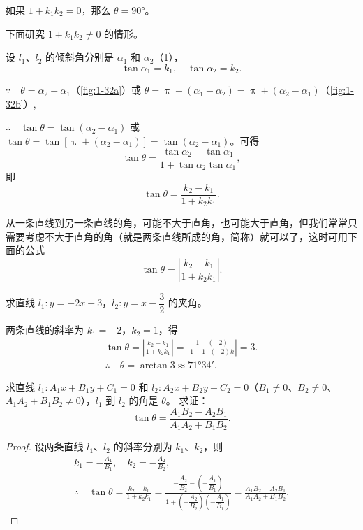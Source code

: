 如果 $1+k_1k_2=0$，那么 $\theta = \ang{90}$。

下面研究 $1+k_1k_2\neq0$ 的情形。

设 $l_1$、$l_2$ 的倾斜角分别是 $\alpha_1$ 和 $\alpha_2$（\cref{fig:1-32}），
\[ \tan\alpha_1=k_1,\quad \tan\alpha_2=k_2.\]
\begin{figure}
  \begin{minipage}[b]{0.48\linewidth}\centering
    \subcaption{}\label{fig:1-32a}
  \end{minipage}
  \begin{minipage}[b]{0.48\linewidth}\centering
    \subcaption{}\label{fig:1-32b}
  \end{minipage}
  \caption{}\label{fig:1-32}
\end{figure}

$\because\quad\theta =\alpha_2-\alpha_1$（\cref{fig:1-32a}）或 $\theta = \uppi - (\alpha_1-\alpha_2) = \uppi+(\alpha_2-\alpha_1)$（\cref{fig:1-32b}）,

$\therefore\quad\tan\theta = \tan(\alpha_2-\alpha_1)$ 或 $\tan\theta = \tan[\uppi+(\alpha_2-\alpha_1)]= \tan(\alpha_2-\alpha_1)$。可得
\[ \tan\theta=\frac{\tan\alpha_2-\tan\alpha_1}{1+\tan\alpha_2\tan\alpha_1},\]
即
\[ \tan\theta = \frac{k_2-k_1}{1+k_2k_1}.\]

从一条直线到另一条直线的角，可能不大于直角，也可能大于直角，但我们常常只需要考虑不大于直角的角（就是两条直线所成的角，简称）就可以了，这时可用下面的公式
\[ \tan\theta = \left|\frac{k_2-k_1}{1+k_2k_1}\right|.\]

\begin{example}
  求直线 $l_1:y=-2x+3$，$l_2:y=x-\dfrac{3}{2}$ 的夹角。
\end{example}
\begin{solution}
  两条直线的斜率为 $k_1= -2$，$k_2=1$，得
  \begin{gather*}
  \tan \theta = \left|\frac{k_2-k_1}{1+k_2k_1}\right| =\left|\frac{1-(-2)}{1+1\cdot(-2)k}\right|=3.\\
  \therefore\quad \theta=\arctan3\approx\ang{71;34;}.
  \end{gather*}
\end{solution}
\begin{example}
  求直线 $l_1:A_1x+B_1y+C_1=0$ 和 $l_2:A_2x+B_2y+C_2=0$（$B_1\neq 0$、$B_2\neq 0$、$A_1A_2+B_1B_2\neq 0$），$l_1$ 到 $l_2$ 的角是 $\theta$。
  求证：
  \[ \tan\theta = \frac{A_1B_2-A_2B_1}{A_1A_2+B_1B_2}.\]
\end{example}
\begin{proof}
  设两条直线 $l_1$、$l_2$ 的斜率分别为 $k_1$、$k_2$，则
  \begin{gather*}
    k_1=-\frac{A_1}{B_1},\quad k_2=-\frac{A_2}{B_2},\\
    \therefore\quad \tan\theta=\frac{k_2-k_1}{1+k_2k_1}=\frac{-\dfrac{A_2}{B_2}-\left(-\dfrac{A_1}{B_1}\right)}{1+\left(-\dfrac{A_2}{B_2}\right)\left(-\dfrac{A_1}{B_1}\right)}=\frac{A_1B_2-A_2B_1}{A_1A_2+B_1B_2}.
  \end{gather*}
\end{proof}

